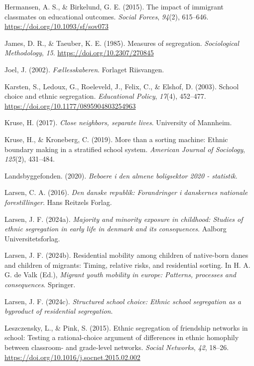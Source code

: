 \documentclass[
]{book}
\newlength{\cslhangindent}
\newenvironment{CSLReferences}[2] %
 {\begin{list}{}{%
  \setlength{\itemindent}{0pt}
  \setlength{\leftmargin}{0pt}
  \setlength{\parsep}{0pt}
  \ifodd #1
   \setlength{\leftmargin}{\cslhangindent}
   \setlength{\itemindent}{-1\cslhangindent}
  \fi
  \setlength{\itemsep}{#2\baselineskip}}}
 {\end{list}}
\begin{document}
\begin{CSLReferences}{1}{0}
Hermansen, A. S., \& Birkelund, G. E. (2015). The impact of immigrant classmates on educational outcomes. \emph{Social Forces}, \emph{94}(2), 615--646. \url{https://doi.org/10.1093/sf/sov073}

James, D. R., \& Taeuber, K. E. (1985). Measures of segregation. \emph{Sociological Methodology}, \emph{15}. \url{https://doi.org/10.2307/270845}

Joel, J. (2002). \emph{Fællesskaberen}. Forlaget Riisvangen.

Karsten, S., Ledoux, G., Roeleveld, J., Felix, C., \& Elshof, D. (2003). School choice and ethnic segregation. \emph{Educational Policy}, \emph{17}(4), 452--477. \url{https://doi.org/10.1177/0895904803254963}

Kruse, H. (2017). \emph{Close neighbors, separate lives}. University of Mannheim.

Kruse, H., \& Kroneberg, C. (2019). More than a sorting machine: Ethnic boundary making in a stratified school system. \emph{American Journal of Sociology}, \emph{125}(2), 431--484.

Landsbyggefonden. (2020). \emph{Beboere i den almene boligsektor 2020 - statistik}.

Larsen, C. A. (2016). \emph{Den danske republik: Forandringer i danskernes nationale forestillinger}. Hans Reitzels Forlag.

Larsen, J. F. (2024a). \emph{Majority and minority exposure in childhood: Studies of ethnic segregation in early life in denmark and its consequences}. Aalborg Universitetsforlag.

Larsen, J. F. (2024b). Residential mobility among children of native-born danes and children of migrants: Timing, relative risks, and residential sorting. In H. A. G. de Valk (Ed.), \emph{Migrant youth mobility in europe: Patterns, processes and consequences}. Springer.

Larsen, J. F. (2024c). \emph{Structured school choice: Ethnic school segregation as a byproduct of residential segregation}.

Leszczensky, L., \& Pink, S. (2015). Ethnic segregation of friendship networks in school: Testing a rational-choice argument of differences in ethnic homophily between classroom- and grade-level networks. \emph{Social Networks}, \emph{42}, 18--26. \url{https://doi.org/10.1016/j.socnet.2015.02.002}


\end{CSLReferences}
\end{document}
